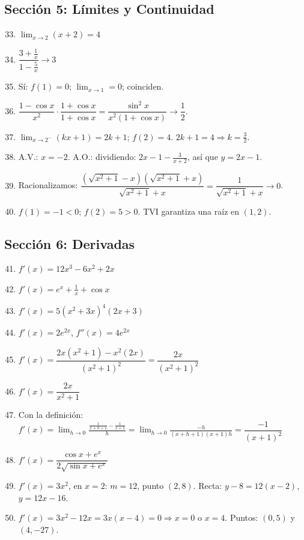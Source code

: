 \documentclass[12pt, a4paper]{article}
\begin{document}
\subsection*{Sección 5: Límites y Continuidad}

\begin{enumerate}[leftmargin=*, label=\textbf{\arabic*.}]
  \setcounter{enumi}{32}
  \item $\lim_{x \to 2} (x + 2) = 4$
  \item $\dfrac{3 + \frac{1}{x}}{1 - \frac{5}{x}} \to 3$
  \item Sí: $f(1) = 0$; $\lim_{x \to 1} = 0$; coinciden.
  \item $\dfrac{1 - \cos x}{x^2} \cdot \dfrac{1 + \cos x}{1 + \cos x} = \dfrac{\sin^2 x}{x^2(1 + \cos x)} \to \dfrac{1}{2}$.
  \item $\lim_{x \to 2^-} (kx + 1) = 2k + 1$; $f(2) = 4$. $2k + 1 = 4 \Rightarrow k = \frac{3}{2}$.
  \item A.V.: $x = -2$. A.O.: dividiendo: $2x - 1 - \frac{3}{x + 2}$, así que $y = 2x - 1$.
  \item Racionalizamos: $\dfrac{(\sqrt{x^2+1} - x)(\sqrt{x^2+1} + x)}{\sqrt{x^2+1} + x} = \dfrac{1}{\sqrt{x^2+1} + x} \to 0$.
  \item $f(1) = -1 < 0$; $f(2) = 5 > 0$. TVI garantiza una raíz en $(1, 2)$.
\end{enumerate}

\subsection*{Sección 6: Derivadas}

\begin{enumerate}[leftmargin=*, label=\textbf{\arabic*.}]
  \setcounter{enumi}{40}
  \item $f'(x) = 12x^3 - 6x^2 + 2x$
  \item $f'(x) = e^x + \frac{1}{x} + \cos x$
  \item $f'(x) = 5(x^2 + 3x)^4(2x + 3)$
  \item $f'(x) = 2e^{2x}$, $f''(x) = 4e^{2x}$
  \item $f'(x) = \dfrac{2x(x^2 + 1) - x^2(2x)}{(x^2 + 1)^2} = \dfrac{2x}{(x^2 + 1)^2}$
  \item $f'(x) = \dfrac{2x}{x^2 + 1}$
  \item Con la definición: $f'(x) = \lim_{h \to 0} \frac{\frac{1}{x+h+1} - \frac{1}{x+1}}{h} = \lim_{h \to 0} \frac{-h}{(x+h+1)(x+1)h} = \dfrac{-1}{(x+1)^2}$
  \item $f'(x) = \dfrac{\cos x + e^x}{2\sqrt{\sin x + e^x}}$
  \item $f'(x) = 3x^2$, en $x = 2$: $m = 12$, punto $(2, 8)$. Recta: $y - 8 = 12(x - 2)$, $y = 12x - 16$.
  \item $f'(x) = 3x^2 - 12x = 3x(x - 4) = 0 \Rightarrow x = 0$ o $x = 4$. Puntos: $(0, 5)$ y $(4, -27)$.
\end{enumerate}
\end{document}
